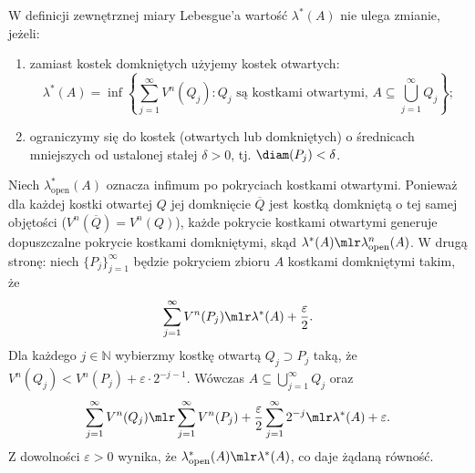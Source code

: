 \begin{uwaga} W definicji zewnętrznej miary Lebesgue'a wartość $\lambda^{*}(A)$ nie ulega zmianie, jeżeli:
    \begin{enumerate}
        \item zamiast kostek domkniętych użyjemy kostek otwartych:
              \begin{equation*} \lambda^{*}(A) = \inf \left\{ \sum_{j=1}^\infty V^n(Q_j) \colon Q_j \text{ są kostkami otwartymi, } A \subseteq \bigcup_{j=1}^\infty Q_j \right\};
              \end{equation*}
        \item ograniczymy się do kostek (otwartych lub domkniętych) o średnicach mniejszych od ustalonej stałej $\delta > 0$, tj. $\diam(P_j) < \delta$.
    \end{enumerate}
\end{uwaga}
\begin{dow} Niech $\lambda_{\mathrm{open}}^{*}(A)$ oznacza infimum po pokryciach kostkami otwartymi. Ponieważ dla każdej kostki otwartej $Q$ jej domknięcie $\overline{Q}$ jest kostką domkniętą o tej samej objętości ($V^n(\overline{Q}) = V^n(Q)$), każde pokrycie kostkami otwartymi generuje dopuszczalne pokrycie kostkami domkniętymi, skąd $\lambda^{*}(A) \mlr \lambda_{\mathrm{open}}^{n}(A)$.
    W drugą stronę: niech $\{P_j\}_{j=1}^\infty$ będzie pokryciem zbioru $A$ kostkami domkniętymi takim, że
    \begin{equation*}
        \sum_{j=1}^\infty V^n(P_j) \mlr \lambda^{*}(A) + \frac{\varepsilon}{2}.
    \end{equation*}
    Dla każdego $j \in \mathbb{N}$ wybierzmy kostkę otwartą $Q_j \supset P_j$ taką, że $V^n(Q_j) < V^n(P_j) + \varepsilon \cdot 2^{-j-1}$. Wówczas $A \subseteq \bigcup_{j=1}^\infty Q_j$ oraz
    \begin{equation*} \sum_{j=1}^\infty V^n(Q_j) \mlr \sum_{j=1}^\infty V^n(P_j) + \frac{\varepsilon}{2} \sum_{j=1}^\infty 2^{-j} \mlr \lambda^{*}(A) + \varepsilon.
    \end{equation*}
    Z dowolności $\varepsilon > 0$ wynika, że $\lambda_{\mathrm{open}}^{*}(A) \mlr \lambda^{*}(A)$, co daje żądaną równość.
\end{dow}

